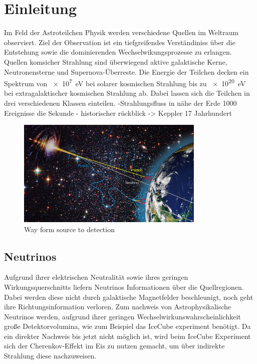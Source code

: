\chapter{Einleitung}
Im Feld der Astroteilchen Physik werden verschiedene Quellen im Weltraum observiert. Ziel der Observation ist ein tiefgreifendes Verständiniss über die Entstehung sowie die dominierenden Wechselwikungsprozesse zu erlangen. Quellen komsicher Strahlung sind überwiegend aktive galaktische Kerne, Neutronensterne und Supernova-Überreste. Die Energie der Teilchen decken ein Spektrum von \SI{e7}{\electronvolt} bei solarer kosmischen Strahlung bis zu \SI{e20}{\electronvolt} bei extragalaktischer kosmischen Strahlung ab. Dabei lassen sich die Teilchen in drei verschiedenen Klassen einteilen. 
-Strahlungsfluss in nähe der Erde 1000 Ereignisse die Sekunde
- historischer rückblick -> Keppler 17 Jahrhundert 
\begin{figure}
  \centering
  \includegraphics[width=0.8\textwidth]{./images/sources-detection.jpg}
  \caption{Way form source to detection~\cite{overview-detec}}
\end{figure}

\section{Neutrinos}
Aufgrund ihrer elektrischen Neutralität sowie ihres geringen Wirkungsquerschnitts liefern Neutrinos Informationen über die Quellregionen. Dabei werden diese nicht durch galaktische Magnetfelder beschleunigt, noch geht ihre Richtungsinformation verloren. Zum nachweis von Astrophysikalische Neutrinos werden, aufgrund ihrer geringen Wechselwirkunswahrscheinlichkeit große Detektorvolumina, wie zum Beispiel das IceCube experiment benötigt. Da ein direkter Nachweis bis jetzt nicht möglich ist, wird beim IceCube Experiment sich der Cherenkov-Effekt im Eis zu nutzen gemacht, um über indirekte Strahlung diese nachzuweisen.



